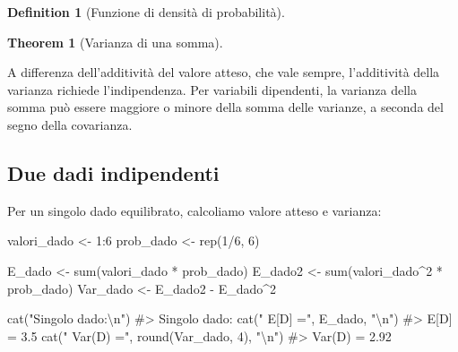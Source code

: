 \documentclass[
  letterpaper,
  DIV=11,
  numbers=noendperiod,
  oneside]{scrreprt}
\newenvironment{Shaded}{\begin{snugshade}}{\end{snugshade}}
\newcommand{\CommentTok}[1]{\textcolor[rgb]{0.37,0.37,0.37}{#1}}
\newcommand{\DecValTok}[1]{\textcolor[rgb]{0.68,0.00,0.00}{#1}}
\newcommand{\FunctionTok}[1]{\textcolor[rgb]{0.28,0.35,0.67}{#1}}
\newcommand{\NormalTok}[1]{\textcolor[rgb]{0.00,0.23,0.31}{#1}}
\newcommand{\OtherTok}[1]{\textcolor[rgb]{0.00,0.23,0.31}{#1}}
\newcommand{\SpecialCharTok}[1]{\textcolor[rgb]{0.37,0.37,0.37}{#1}}
\newcommand{\StringTok}[1]{\textcolor[rgb]{0.13,0.47,0.30}{#1}}
\theoremstyle{definition}
\theoremstyle{plain}
\newtheorem{theorem}{Theorem}[chapter]
\theoremstyle{definition}
\newtheorem{definition}{Definition}[chapter]
\theoremstyle{remark}
\begin{document}
\begin{definition}[Funzione di densità di
probabilità]
\begin{theorem}[Varianza di una
somma]
\end{theorem}

A differenza dell'additività del valore atteso, che vale sempre,
l'additività della varianza richiede l'indipendenza. Per variabili
dipendenti, la varianza della somma può essere maggiore o minore della
somma delle varianze, a seconda del segno della covarianza.

\begin{tcolorbox}[enhanced jigsaw, arc=.35mm, breakable, colbacktitle=quarto-callout-note-color!10!white, opacityback=0, toprule=.15mm, rightrule=.15mm, colback=white, opacitybacktitle=0.6, leftrule=.75mm, coltitle=black, bottomtitle=1mm, left=2mm, toptitle=1mm, title=\textcolor{quarto-callout-note-color}{\faInfo}\hspace{0.5em}{Esempio: Varianza della somma vs varianza dei componenti}, titlerule=0mm, bottomrule=.15mm, colframe=quarto-callout-note-color-frame]

\subsection{Due dadi indipendenti}\label{due-dadi-indipendenti}

Per un singolo dado equilibrato, calcoliamo valore atteso e varianza:

\begin{Shaded}
\begin{Highlighting}[]
\NormalTok{valori\_dado }\OtherTok{\textless{}{-}} \DecValTok{1}\SpecialCharTok{:}\DecValTok{6}
\NormalTok{prob\_dado }\OtherTok{\textless{}{-}} \FunctionTok{rep}\NormalTok{(}\DecValTok{1}\SpecialCharTok{/}\DecValTok{6}\NormalTok{, }\DecValTok{6}\NormalTok{)}

\NormalTok{E\_dado }\OtherTok{\textless{}{-}} \FunctionTok{sum}\NormalTok{(valori\_dado }\SpecialCharTok{*}\NormalTok{ prob\_dado)}
\NormalTok{E\_dado2 }\OtherTok{\textless{}{-}} \FunctionTok{sum}\NormalTok{(valori\_dado}\SpecialCharTok{\^{}}\DecValTok{2} \SpecialCharTok{*}\NormalTok{ prob\_dado)}
\NormalTok{Var\_dado }\OtherTok{\textless{}{-}}\NormalTok{ E\_dado2 }\SpecialCharTok{{-}}\NormalTok{ E\_dado}\SpecialCharTok{\^{}}\DecValTok{2}

\FunctionTok{cat}\NormalTok{(}\StringTok{"Singolo dado:}\SpecialCharTok{\textbackslash{}n}\StringTok{"}\NormalTok{)}
\CommentTok{\#\textgreater{} Singolo dado:}
\FunctionTok{cat}\NormalTok{(}\StringTok{"  E[D] ="}\NormalTok{, E\_dado, }\StringTok{"}\SpecialCharTok{\textbackslash{}n}\StringTok{"}\NormalTok{)}
\CommentTok{\#\textgreater{}   E[D] = 3.5}
\FunctionTok{cat}\NormalTok{(}\StringTok{"  Var(D) ="}\NormalTok{, }\FunctionTok{round}\NormalTok{(Var\_dado, }\DecValTok{4}\NormalTok{), }\StringTok{"}\SpecialCharTok{\textbackslash{}n}\StringTok{"}\NormalTok{)}
\CommentTok{\#\textgreater{}   Var(D) = 2.92}
\end{Highlighting}
\end{Shaded}


\end{tcolorbox}
\end{definition}
\end{document}

